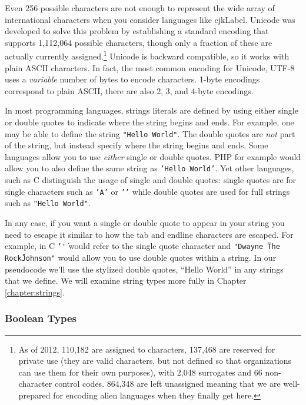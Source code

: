 Even 256 possible characters are not enough to represent the wide array of international
characters when you consider languages like \gls{cjkLabel}.
Unicode  was developed to solve this problem by establishing a standard encoding
that supports 1,112,064 possible characters, though only a fraction of these are actually
currently assigned.\footnote{As of 2012, 110,182 are assigned to characters, 137,468 are 
reserved for private use (they are valid characters, but not defined so that organizations can
use them for their own purposes), with 2,048 surrogates and 66 non-character control 
codes.  864,348 are left unassigned meaning that we are well-prepared for encoding
alien languages when they finally get here.}  Unicode is \gls{backward compatible}, so
it works with plain ASCII characters.  In fact, the most common encoding for Unicode, UTF-8 
uses a \emph{variable} number of bytes to encode characters.  1-byte encodings correspond
to plain ASCII, there are also 2, 3, and 4-byte encodings.

In most programming languages, strings \glspl{literal} are defined by 
using either single or double quotes to indicate where the string begins 
and ends.  For example, one may be able to define the string 
\texttt{"Hello World"}.  The double quotes are \emph{not}
part of the string, but instead specify where the string begins and ends.  Some languages
allow you to use \emph{either} single or double quotes.  PHP for example would allow you
to also define the same string as \texttt{'Hello World'}.  Yet other languages, such 
as C distinguish the usage of single and double quotes: single quotes are for single characters
such as \texttt{'A'} or \texttt{'\n'} while double quotes are used for full 
strings such as \texttt{"Hello World"}.

In any case, if you want a single or double quote to appear in your string you need to
escape it similar to how the tab and endline characters are escaped.  For example, in C 
\texttt{'\''} would refer to the single quote character and 
\texttt{"Dwayne \"The Rock\" Johnson"} would allow you to use double quotes
within a string.  In our pseudocode we'll use the stylized double quotes, ``Hello World'' 
in any strings that we define.  We will examine string types more fully in Chapter \ref{chapter:strings}.

\subsubsection{Boolean Types}

